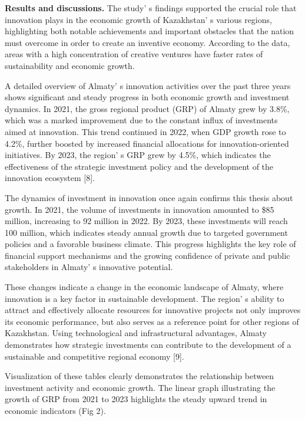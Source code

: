 \begin{multicols}{2}
{\bfseries Results and discussions.} The study' s findings
supported the crucial role that innovation plays in the economic growth
of Kazakhstan' s various regions, highlighting both
notable achievements and important obstacles that the nation must
overcome in order to create an inventive economy. According to the data,
areas with a high concentration of creative ventures have faster rates
of sustainability and economic growth.

A detailed overview of Almaty' s innovation activities
over the past three years shows significant and steady progress in both
economic growth and investment dynamics. In 2021, the gross regional
product (GRP) of Almaty grew by 3.8\%, which was a marked improvement
due to the constant influx of investments aimed at innovation. This
trend continued in 2022, when GDP growth rose to 4.2\%, further boosted
by increased financial allocations for innovation-oriented initiatives.
By 2023, the region' s GRP grew by 4.5\%, which indicates
the effectiveness of the strategic investment policy and the development
of the innovation ecosystem {[}8{]}.

The dynamics of investment in innovation once again confirms this thesis
about growth. In 2021, the volume of investments in innovation amounted
to \$85 million, increasing to 92 million in 2022. By 2023, these
investments will reach 100 million, which indicates steady annual growth
due to targeted government policies and a favorable business climate.
This progress highlights the key role of financial support mechanisms
and the growing confidence of private and public stakeholders in
Almaty' s innovative potential.

These changes indicate a change in the economic landscape of Almaty,
where innovation is a key factor in sustainable development. The
region' s ability to attract and effectively allocate
resources for innovative projects not only improves its economic
performance, but also serves as a reference point for other regions of
Kazakhstan. Using technological and infrastructural advantages, Almaty
demonstrates how strategic investments can contribute to the development
of a sustainable and competitive regional economy {[}9{]}.

Visualization of these tables clearly demonstrates the relationship
between investment activity and economic growth. The linear graph
illustrating the growth of GRP from 2021 to 2023 highlights the steady
upward trend in economic indicators (Fig 2).
\end{multicols}

